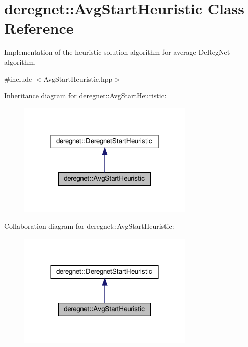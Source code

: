 \hypertarget{classderegnet_1_1AvgStartHeuristic}{}\section{deregnet\+:\+:Avg\+Start\+Heuristic Class Reference}
\label{classderegnet_1_1AvgStartHeuristic}


Implementation of the heuristic solution algorithm for average De\+Reg\+Net algorithm.  




{\ttfamily \#include $<$Avg\+Start\+Heuristic.\+hpp$>$}



Inheritance diagram for deregnet\+:\+:Avg\+Start\+Heuristic\+:\nopagebreak
\begin{figure}[H]
\begin{center}
\leavevmode
\includegraphics[width=240pt]{classderegnet_1_1AvgStartHeuristic__inherit__graph}
\end{center}
\end{figure}


Collaboration diagram for deregnet\+:\+:Avg\+Start\+Heuristic\+:\nopagebreak
\begin{figure}[H]
\begin{center}
\leavevmode
\includegraphics[width=240pt]{classderegnet_1_1AvgStartHeuristic__coll__graph}
\end{center}
\end{figure}
